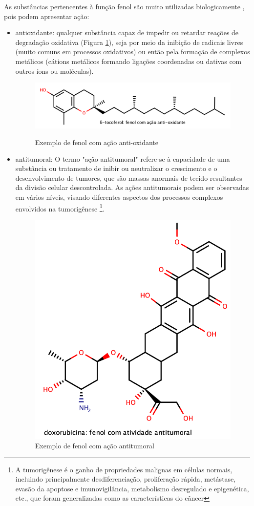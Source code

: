 As substâncias pertencentes à função fenol são muito utilizadas biologicamente \cite{doi:10.1021/acs.jmedchem.2c00223}, pois podem apresentar ação:

\begin{itemize}
    \item antioxidante: qualquer substância capaz de impedir ou retardar reações de degradação oxidativa (Figura \ref{fig:toco}), seja por meio da inibição de radicais livres (muito comuns em processos oxidativos) ou então pela formação de complexos metálicos (cátions metálicos formando ligações coordenadas ou dativas com outros íons ou moléculas). 

    \begin{figure}[H]
        \centering
        \caption{Exemplo de fenol com ação anti-oxidante}
        \vspace{0.5cm}
        \includegraphics[width=1\linewidth]{imagens/tocoferol.png}
    \label{fig:toco}
    \end{figure}
    \item antitumoral: O termo "ação antitumoral" refere-se à capacidade de uma substância ou tratamento de inibir ou neutralizar o crescimento e o desenvolvimento de tumores, que são massas anormais de tecido resultantes da divisão celular descontrolada. As ações antitumorais podem ser observadas em vários níveis, visando diferentes aspectos dos processos complexos envolvidos na tumorigênese \footnote{A tumorigênese é o ganho de propriedades malignas em células normais, incluindo principalmente desdiferenciação, proliferação rápida, metástase, evasão da apoptose e imunovigilância, metabolismo desregulado e epigenética, etc., que foram generalizadas como as características do câncer}.
    \begin{figure}[H]
        \centering
        \caption{Exemplo de fenol com ação antitumoral}
        \vspace{0.5cm}
        \includegraphics[width=0.5\linewidth]{imagens/dr.png}

\end{figure}
\end{itemize}
